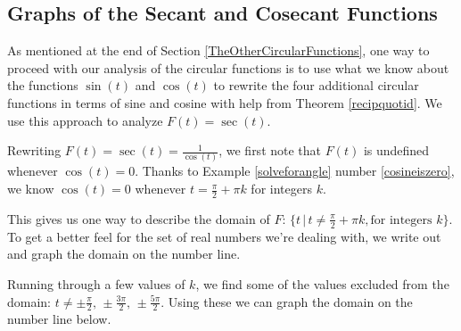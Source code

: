 \documentclass{ximera}
\begin{document}
	\author{Stitz-Zeager}




\setcounter{footnote}{0}

\label{GraphsofOtherCircularFunctions}


\subsection{Graphs of the Secant and Cosecant Functions}
\label{secantcosecantgraphsection}

As mentioned at the end of Section \ref{TheOtherCircularFunctions}, one way to proceed with our analysis of the circular functions is to use what we know about the functions $\sin(t)$ and $\cos(t)$ to rewrite the four additional circular functions in terms of sine and cosine with help from Theorem \ref{recipquotid}.  We use this approach to analyze $F(t) = \sec(t)$.



Rewriting $F(t) = \sec(t)= \frac{1}{\cos(t)}$, we first note that  $F(t)$ is undefined whenever $\cos(t) = 0$.  Thanks to Example \ref{solveforangle} number \ref{cosineiszero}, we know $\cos(t) = 0$ whenever $t = \frac{\pi}{2} + \pi k$ for integers $k$.



This gives us one way to describe the domain of $F$:  $\{ t \, | \, t \neq  \frac{\pi}{2} + \pi k, \text{for integers $k$} \}$.  To get a better feel for the set of real numbers we're dealing with, we write out and graph the domain on the number line.



Running through a few values of $k$, we find some of the values excluded from the domain:   $t \neq  \pm \frac{\pi}{2}, \, \pm \frac{3\pi}{2}, \, \pm \frac{5\pi}{2}$.  Using these we can graph the domain on the number line below.
\end{document}
